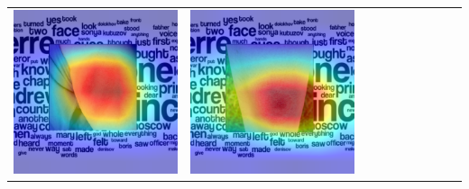 \begin{landscape}
\begin{table}[]
\begin{tabular}{@{}c c c c c c c c c c@{}}
			\includegraphics[width=.12\textheight ,keepaspectratio]{images/pretraining/gradcam/3/ResNet50CombinedGradCam.png} &
			\includegraphics[width=.12\textheight ,keepaspectratio]{images/pretraining/gradcam/9/ResNet50CombinedGradCam.png} &

\end{tabular}
\end{table}
\end{landscape}
